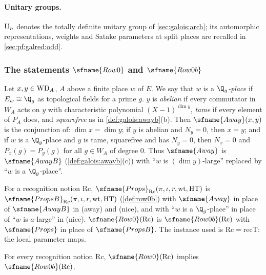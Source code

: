 \paragraph{Unitary groups.} $\mathrm{U}_n$ denotes the totally definite unitary group of
\cref{sec:galois:arch}; its automorphic representations, weights and Satake parameters at split places are
recalled in \cref{sec:pf:galred:odd}.

\subsubsection{The statements \texorpdfstring{$\sfname{Row0}$}{Row0} and \texorpdfstring{$\sfname{Row0b}$}{Row0b}}

\begin{definition}\label{pf:galred:row0}
Let $x,y\in\mathrm{WD}_A$, $A$ above a finite place $w$ of $E$. We say that $w$ is a \emph{$\Q_g$-place} if
$E_w\cong\Q_g$ as topological fields for a prime $g$. $y$ is \emph{abelian} if every commutator in $W_A$ acts on
$y$ with characteristic polynomial $(X-1)^{\dim y}$, \emph{tame} if every element of $P_A$ does, and
\emph{squarefree} as in \cref{def:galois:awayb}(b). Then $\sfname{Away}(x,y)$ is the conjunction of: $\dim
x=\dim y$; if $y$ is abelian and $N_y=0$, then $x=y$; and if $w$ is a $\Q_g$-place and $y$ is tame, squarefree
and has $N_y=0$, then $N_x=0$ and $P_x(g)=P_y(g)$ for all $g\in W_A$ of degree $0$. Thus $\sfname{Away}$ is
$\sfname{AwayB}$ (\cref{def:galois:awayb}(c)) with ``$w$ is $(\dim y)$-large'' replaced by ``$w$ is a
$\Q_g$-place''.

For a recognition notion $\mathrm{Rc}$, $\sfname{Props}_{\mathrm{Rc}}(\pi,\iota,r,\mathrm{wt},\galredHT)$ is
$\sfname{PropsB}_{\mathrm{Rc}}(\pi,\iota,r,\mathrm{wt},\galredHT)$ (\cref{def:row0b}) with $\sfname{Away}$ in place of
$\sfname{AwayB}$ in (away) and (nice), and with ``$w$ is a $\Q_g$-place'' in place of ``$w$ is $a$-large'' in
(nice). $\sfname{Row0}(\mathrm{Rc})$ is $\sfname{Row0b}(\mathrm{Rc})$ with $\sfname{Props}$ in place of
$\sfname{PropsB}$. The instance used is $\mathrm{Rc}=\mathrm{recT}$: the local parameter maps.
\end{definition}

\begin{lemma}\label{pf:galred:row0b}
For every recognition notion $\mathrm{Rc}$, $\sfname{Row0}(\mathrm{Rc})$ implies $\sfname{Row0b}(\mathrm{Rc})$.
\end{lemma}

